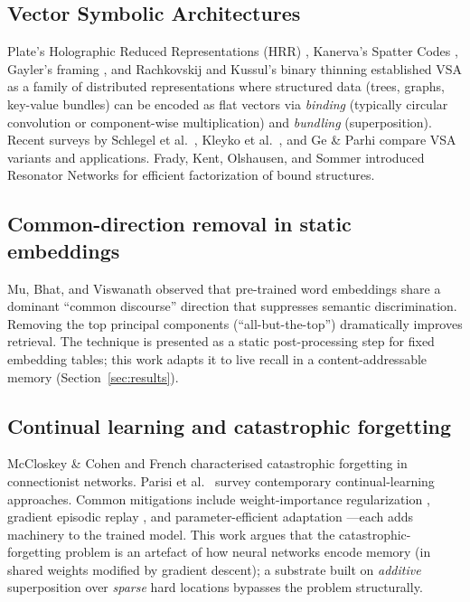 \documentclass[11pt,a4paper]{article}
\begin{document}
\subsection{Vector Symbolic Architectures}
Plate's Holographic Reduced Representations (HRR)
\cite{plate1995holographic}, Kanerva's Spatter Codes
\cite{kanerva2009hyperdimensional}, Gayler's framing
\cite{gayler2003vector}, and Rachkovskij and Kussul's binary thinning
\cite{rachkovskij2001binding} established VSA as a family of distributed
representations where structured data (trees, graphs, key-value bundles)
can be encoded as flat vectors via \emph{binding} (typically circular
convolution or component-wise multiplication) and \emph{bundling}
(superposition).  Recent surveys by Schlegel et al.\
\cite{schlegel2022comparison}, Kleyko et al.\ \cite{kleyko2022survey},
and Ge \& Parhi \cite{ge2020classification} compare VSA variants and
applications.  Frady, Kent, Olshausen, and Sommer
\cite{frady2020resonator,kent2020resonator2} introduced Resonator
Networks for efficient factorization of bound structures.

\subsection{Common-direction removal in static embeddings}
Mu, Bhat, and Viswanath \cite{mu2017all} observed that pre-trained word
embeddings share a dominant ``common discourse'' direction that
suppresses semantic discrimination.  Removing the top principal components
(``all-but-the-top'') dramatically improves retrieval.  The technique is
presented as a static post-processing step for fixed embedding tables;
this work adapts it to live recall in a content-addressable memory
(Section~\ref{sec:results}).

\subsection{Continual learning and catastrophic forgetting}
McCloskey \& Cohen \cite{mccloskey1989catastrophic} and French
\cite{french1999catastrophic} characterised catastrophic forgetting in
connectionist networks.  Parisi et al.\ \cite{parisi2019continual} survey
contemporary continual-learning approaches.  Common mitigations include
weight-importance regularization
\cite{kirkpatrick2017overcoming,aljundi2018memory}, gradient episodic
replay \cite{lopez2017gradient}, and parameter-efficient adaptation
\cite{hu2022lora}---each adds machinery to the trained model.  This work
argues that the catastrophic-forgetting problem is an artefact of how
neural networks encode memory (in shared weights modified by gradient
descent);  a substrate built on \emph{additive} superposition over
\emph{sparse} hard locations bypasses the problem structurally.
\end{document}
